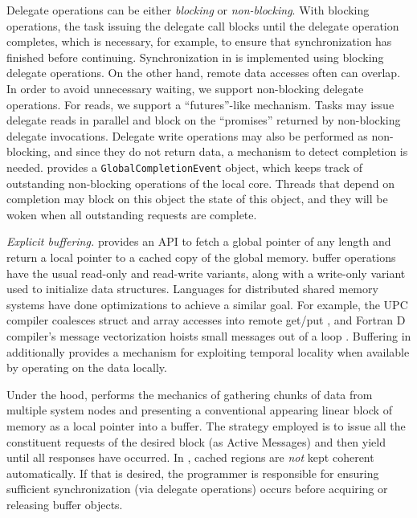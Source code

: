 Delegate operations can be either {\em blocking} or {\em non-blocking}.
With blocking operations, the task issuing the delegate call blocks until
the delegate operation completes, which is necessary, for example, to ensure
that synchronization has finished before continuing. Synchronization in \Grappa
is implemented using blocking delegate operations. On the other hand, remote data
accesses often can overlap. In order to avoid
unnecessary waiting, we support non-blocking delegate operations. For reads,
we support a ``futures''-like mechanism. Tasks may issue delegate reads in
parallel and block on the ``promises'' returned by non-blocking delegate
invocations. Delegate write operations may also be performed as
non-blocking,
and since they do not return data, a mechanism to detect completion is needed.
\Grappa provides a \texttt{GlobalCompletionEvent} object, which keeps track of
outstanding non-blocking operations of the local core. Threads that depend on completion may block on this object
the state of this object, and they will be woken when all outstanding requests are
complete. 

\vspace{1ex}
\textit{Explicit buffering.} \Grappa provides an API to fetch a global pointer of
any length and return a local pointer to a cached copy of the global memory.
\Grappa buffer operations have the usual read-only and read-write variants,
along with a write-only variant used to initialize data structures. Languages
for distributed shared memory systems have done optimizations to achieve a
similar goal. For example, the UPC compiler coalesces struct and array
accesses into remote get/put \cite{Chen:2005}, and Fortran D compiler's
message vectorization hoists small messages out of a loop
\cite{FortranD:1992}. Buffering in \Grappa additionally provides a mechanism for
exploiting temporal locality when available by operating on the data locally.

Under the hood, \Grappa performs the mechanics of gathering chunks of data from
multiple system nodes and presenting a conventional appearing linear block of
memory as a local pointer into a buffer. The strategy employed is to issue all
the constituent requests of the desired block (as Active Messages) and then
yield until all responses have occurred. In \Grappa, cached regions are
\emph{not\/} kept coherent automatically. If that is desired, the programmer is
responsible for ensuring sufficient synchronization (via delegate operations)
occurs before acquiring or releasing buffer objects.

